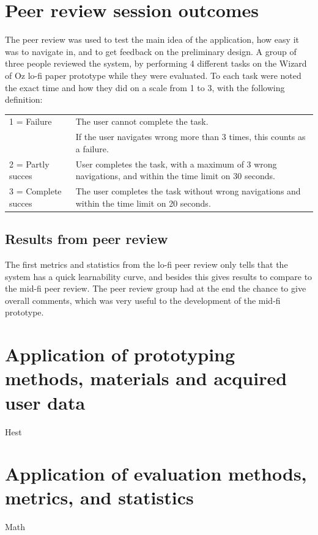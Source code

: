 \section{Peer review session outcomes}
The peer review was used to test the main idea of the application, how easy it was to navigate in, and to get feedback on the preliminary design. A group of three people reviewed the system, by performing 4 different tasks on the Wizard of Oz lo-fi paper prototype while they were evaluated. To each task were noted the exact time and how they did on a scale from 1 to 3, with the following definition:
\begin{table}[H]
    \begin{tabular}{|p{4cm} p{10cm}|}
    \hline
    1 = Failure         & The user cannot complete the task. \\
    ~ & If the user navigates wrong more than 3 times, this counts as a failure. \\ \hline
    2 = Partly succes   & User completes the task, with a maximum of 3 wrong navigations, and within the time limit on 30 seconds.    \\ \hline
    3 = Complete succes & The user completes the task without wrong navigations and within the time limit on 20 seconds.              \\ \hline
    \end{tabular}
\end{table}

\subsection{Results from peer review}
The first metrics and statistics from the lo-fi peer review only tells that the system has a quick learnability curve, and besides this gives results to compare to the mid-fi peer review. 
The peer review group had at the end the chance to give overall comments, which was very useful to the development of the mid-fi prototype. 


\section{Application of prototyping methods, materials and acquired user data}
Hest

\section{Application of evaluation methods, metrics, and statistics}
Math